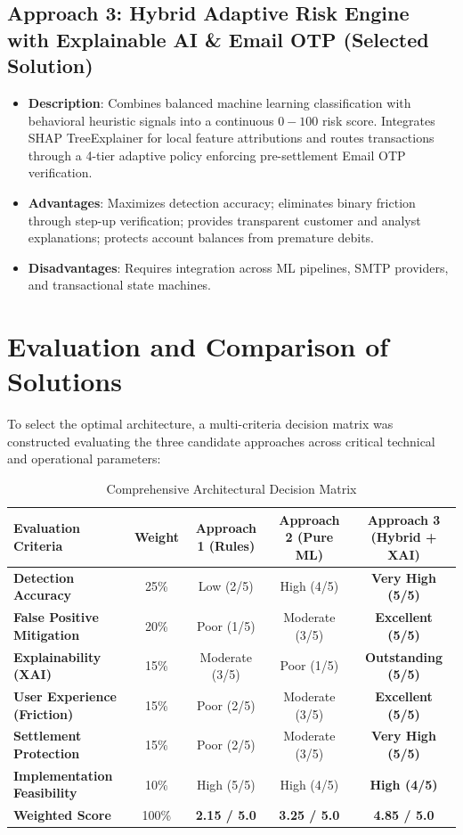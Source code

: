 \subsection{Approach 3: Hybrid Adaptive Risk Engine with Explainable AI \& Email OTP (Selected Solution)}
\begin{itemize}
    \item \textbf{Description}: Combines balanced machine learning classification with behavioral heuristic signals into a continuous $0-100$ risk score. Integrates SHAP TreeExplainer for local feature attributions and routes transactions through a 4-tier adaptive policy enforcing pre-settlement Email OTP verification.
    \item \textbf{Advantages}: Maximizes detection accuracy; eliminates binary friction through step-up verification; provides transparent customer and analyst explanations; protects account balances from premature debits.
    \item \textbf{Disadvantages}: Requires integration across ML pipelines, SMTP providers, and transactional state machines.
\end{itemize}

\section{Evaluation and Comparison of Solutions}
To select the optimal architecture, a multi-criteria decision matrix was constructed evaluating the three candidate approaches across critical technical and operational parameters:

\begin{table}[h]
\centering
\caption{Comprehensive Architectural Decision Matrix}
\label{tab:decision_matrix}
\begin{tabularx}{\textwidth}{lcccc}
\toprule
\textbf{Evaluation Criteria} & \textbf{Weight} & \textbf{Approach 1 (Rules)} & \textbf{Approach 2 (Pure ML)} & \textbf{Approach 3 (Hybrid + XAI)} \\
\midrule
\textbf{Detection Accuracy} & 25\% & Low (2/5) & High (4/5) & \textbf{Very High (5/5)} \\
\textbf{False Positive Mitigation} & 20\% & Poor (1/5) & Moderate (3/5) & \textbf{Excellent (5/5)} \\
\textbf{Explainability (XAI)} & 15\% & Moderate (3/5) & Poor (1/5) & \textbf{Outstanding (5/5)} \\
\textbf{User Experience (Friction)} & 15\% & Poor (2/5) & Moderate (3/5) & \textbf{Excellent (5/5)} \\
\textbf{Settlement Protection} & 15\% & Poor (2/5) & Moderate (3/5) & \textbf{Very High (5/5)} \\
\textbf{Implementation Feasibility}& 10\% & High (5/5) & High (4/5) & \textbf{High (4/5)} \\
\midrule
\textbf{Weighted Score} & 100\% & \textbf{2.15 / 5.0} & \textbf{3.25 / 5.0} & \textbf{4.85 / 5.0} \\
\bottomrule
\end{tabularx}
\end{table}

